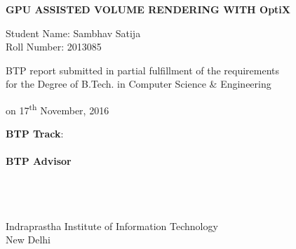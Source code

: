 \begin{center}

\vspace{5.65in}

{\LARGE \bf {GPU ASSISTED VOLUME RENDERING WITH OptiX}

 }
 \vspace{.3in}

 {\Large{Student Name: Sambhav Satija}} \\
 {\large{Roll Number: 2013085}} \\
 \vspace{.1in}



    \vspace{.65in}



\vspace{.65in}


 {BTP report submitted in partial fulfillment of the requirements
\\for the Degree of B.Tech. in Computer Science \& Engineering}


on {17\textsuperscript{th} November, 2016} \\

\vspace{.65in}

\textbf{BTP Track}: \btptrack\\
\quad\\

  {\textbf{BTP Advisor} \\
\supervisorone              \\
\supervisortwo \\
\supervisorthree \\ }
\vspace{3.0in}


{Indraprastha Institute of Information Technology\\
New Delhi}



\end{center}


